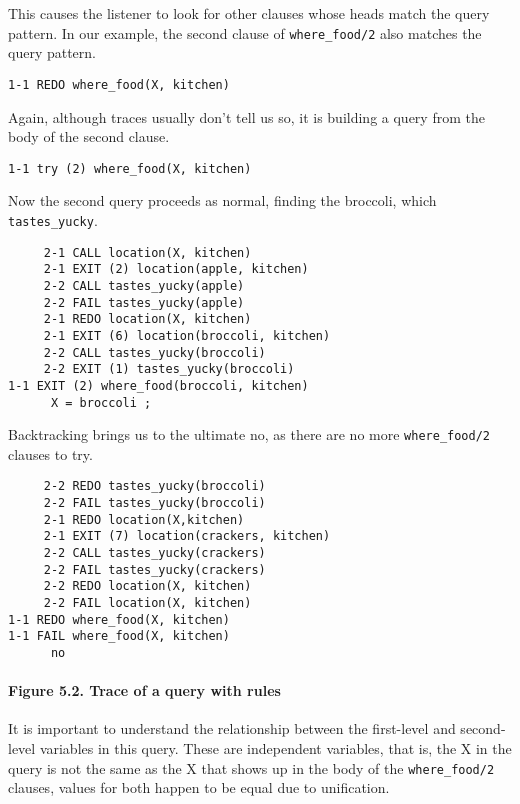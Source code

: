 This causes the listener to look for other clauses whose heads match the query
pattern. In our example, the second clause of \verb'where_food/2' also matches
the query pattern.

\begin{verbatim}
1-1 REDO where_food(X, kitchen)
\end{verbatim}

Again, although traces usually don't tell us so, it is building a query from the
body of the second clause.

\begin{verbatim}
1-1 try (2) where_food(X, kitchen)
\end{verbatim}

Now the second query proceeds as normal, finding the broccoli, which
\verb'tastes_yucky'.

\begin{verbatim}
     2-1 CALL location(X, kitchen)
     2-1 EXIT (2) location(apple, kitchen)
     2-2 CALL tastes_yucky(apple)
     2-2 FAIL tastes_yucky(apple)
     2-1 REDO location(X, kitchen)
     2-1 EXIT (6) location(broccoli, kitchen)
     2-2 CALL tastes_yucky(broccoli)
     2-2 EXIT (1) tastes_yucky(broccoli)
1-1 EXIT (2) where_food(broccoli, kitchen)
      X = broccoli ;
\end{verbatim}

Backtracking brings us to the ultimate no, as there are no more
\verb'where_food/2' clauses to try.

\begin{verbatim}
     2-2 REDO tastes_yucky(broccoli)
     2-2 FAIL tastes_yucky(broccoli)
     2-1 REDO location(X,kitchen)
     2-1 EXIT (7) location(crackers, kitchen)
     2-2 CALL tastes_yucky(crackers)
     2-2 FAIL tastes_yucky(crackers)
     2-2 REDO location(X, kitchen)
     2-2 FAIL location(X, kitchen)
1-1 REDO where_food(X, kitchen)
1-1 FAIL where_food(X, kitchen)
      no
\end{verbatim}
      
\paragraph{Figure 5.2. Trace of a query with rules}

It is important to understand the relationship between the first-level and
second-level variables in this query. These are independent variables, that is,
the X in the query is not the same as the X that shows up in the body of the
\verb'where_food/2' clauses, values for both happen to be equal due to
unification.

